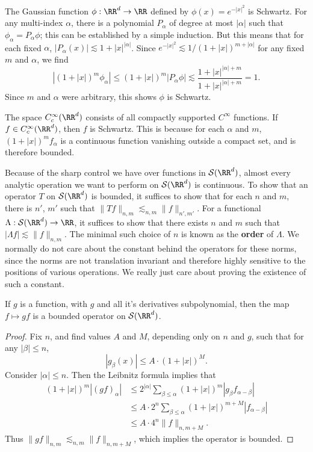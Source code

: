 \begin{example}
	The Gaussian function $\phi: \RR^d \to \RR$ defined by $\phi(x) = e^{-|x|^2}$ is Schwartz. For any multi-index $\alpha$, there is a polynomial $P_\alpha$ of degree at most $|\alpha|$ such that $\phi_\alpha = P_\alpha \phi$; this can be established by a simple induction. But this means that for each fixed $\alpha$, $|P_\alpha(x)| \lesssim 1 + |x|^{|\alpha|}$. Since $e^{-|x|^2} \lesssim 1/(1 + |x|)^{m + |\alpha|}$ for any fixed $m$ and $\alpha$, we find
	\[ | (1 + |x|)^m \phi_\alpha| \leq (1 + |x|)^m |P_\alpha \phi| \lesssim \frac{1 + |x|^{|\alpha| + m}}{1 + |x|^{|\alpha| + m}} = 1. \]
	Since $m$ and $\alpha$ were arbitrary, this shows $\phi$ is Schwartz.
\end{example}

\begin{example}
	The space $C^\infty_c(\RR^d)$ consists of all compactly supported $C^\infty$ functions. If $f \in C^\infty_c(\RR^d)$, then $f$ is Schwartz. This is because for each $\alpha$ and $m$, $(1 + |x|)^m f_\alpha$ is a continuous function vanishing outside a compact set, and is therefore bounded.
\end{example} 

Because of the sharp control we have over functions in $\mathcal{S}(\RR^d)$, almost every analytic operation we want to perform on $\mathcal{S}(\RR^d)$ is continuous. To show that an operator $T$ on $\mathcal{S}(\RR^d)$ is bounded, it suffices to show that for each $n$ and $m$, there is $n'$, $m'$ such that $\| Tf \|_{n,m} \lesssim_{n,m} \| f \|_{n',m'}$. For a functional $\Lambda: \mathcal{S}(\RR^d) \to \RR$, it suffices to show that there exists $n$ and $m$ such that $|\Lambda f| \lesssim \| f \|_{n,m}$. The minimal such choice of $n$ is known as the {\bf order} of $\Lambda$. We normally do not care about the constant behind the operators for these norms, since the norms are not translation invariant and therefore highly sensitive to the positions of various operations. We really just care about proving the existence of such a constant.

\begin{lemma}
	If $g$ is a function, with $g$ and all it's derivatives subpolynomial, then the map $f \mapsto gf$ is a bounded operator on $\mathcal{S}(\RR^d)$.
\end{lemma}
\begin{proof}
	Fix $n$, and find values $A$ and $M$, depending only on $n$ and $g$, such that for any $|\beta| \leq n$,
	\[ |g_\beta(x)| \leq A \cdot (1 + |x|)^M. \]
	Consider $|\alpha| \leq n$. Then the Leibnitz formula implies that
	\begin{align*}
		(1 + |x|)^m |(gf)_\alpha| &\leq 2^{|\alpha|} \sum_{\beta \leq \alpha} (1 + |x|)^m |g_\beta f_{\alpha-\beta}|\\
		&\leq A \cdot 2^n \sum_{\beta \leq \alpha} (1 + |x|)^{m+M} |f_{\alpha-\beta}|\\
		&\leq A \cdot 4^n \| f \|_{n,m+M}.
	\end{align*}
	Thus $\| gf \|_{n,m} \lesssim_{n,m} \| f \|_{n,m+M}$, which implies the operator is bounded.
\end{proof}

